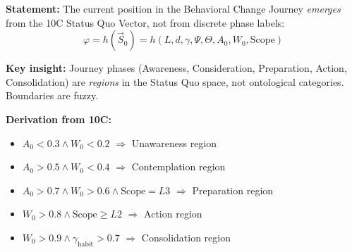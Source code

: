 \begin{tcolorbox}[colback=blue!5!white, colframe=blue!75!black,
    title=\textbf{Axiom EIT-4: Journey-Position Emergence}]

\textbf{Statement:} The current position in the Behavioral Change Journey \textit{emerges} from the 10C Status Quo Vector, not from discrete phase labels:
\begin{equation}
\boxed{\varphi = h(\vec{S}_0) = h(L, d, \gamma, \Psi, \Theta, A_0, W_0, \text{Scope})}
\label{eq:hhh-journey-emergence}
\end{equation}

\textbf{Key insight:} Journey phases (Awareness, Consideration, Preparation, Action, Consolidation) are \textit{regions} in the Status Quo space, not ontological categories. Boundaries are fuzzy.

\textbf{Derivation from 10C:}
\begin{itemize}[nosep]
    \item $A_0 < 0.3 \land W_0 < 0.2$ $\Rightarrow$ Unawareness region
    \item $A_0 > 0.5 \land W_0 < 0.4$ $\Rightarrow$ Contemplation region
    \item $A_0 > 0.7 \land W_0 > 0.6 \land \text{Scope} = L3$ $\Rightarrow$ Preparation region
    \item $W_0 > 0.8 \land \text{Scope} \geq L2$ $\Rightarrow$ Action region
    \item $W_0 > 0.9 \land \gamma_{\text{habit}} > 0.7$ $\Rightarrow$ Consolidation region
\end{itemize}
\end{tcolorbox}

